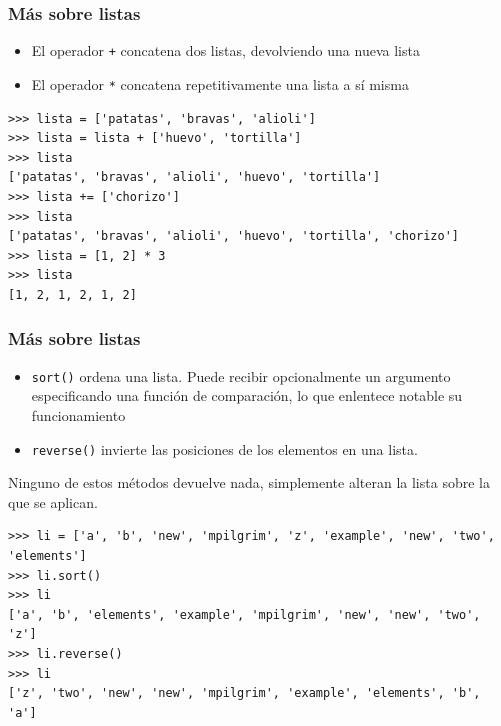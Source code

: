 \documentclass{beamer}
\begin{document}
\begin{frame}[fragile]
\frametitle{Más sobre listas}

\begin{itemize}
\item El operador \verb|+| concatena dos listas, devolviendo una nueva
  lista
\item El operador \verb|*| concatena repetitivamente una lista a sí
  misma
\end{itemize}

\begin{footnotesize}
\begin{verbatim}
>>> lista = ['patatas', 'bravas', 'alioli']
>>> lista = lista + ['huevo', 'tortilla'] 
>>> lista
['patatas', 'bravas', 'alioli', 'huevo', 'tortilla']
>>> lista += ['chorizo']                
>>> lista
['patatas', 'bravas', 'alioli', 'huevo', 'tortilla', 'chorizo']
>>> lista = [1, 2] * 3              
>>> lista
[1, 2, 1, 2, 1, 2]
\end{verbatim}
\end{footnotesize}



\end{frame}



\begin{frame}[fragile]
\frametitle{Más sobre listas}

\begin{itemize}
\item \verb|sort()| ordena una lista. Puede recibir opcionalmente un
  argumento especificando una función de comparación, lo que enlentece
  notable su funcionamiento
\item \verb|reverse()| invierte las posiciones de los elementos en una
  lista.
\end{itemize}
Ninguno de estos métodos devuelve nada, simplemente alteran la lista
sobre la que se aplican.
\begin{footnotesize}
\begin{verbatim}
>>> li = ['a', 'b', 'new', 'mpilgrim', 'z', 'example', 'new', 'two', 'elements']
>>> li.sort() 
>>> li
['a', 'b', 'elements', 'example', 'mpilgrim', 'new', 'new', 'two', 'z']
>>> li.reverse()
>>> li
['z', 'two', 'new', 'new', 'mpilgrim', 'example', 'elements', 'b', 'a']
\end{verbatim}
\end{footnotesize}

\end{frame}
\end{document}
